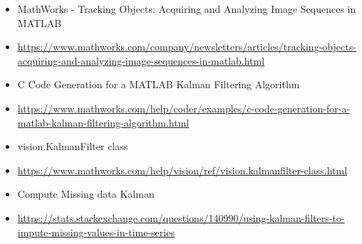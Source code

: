 \begin{itemize}
\item[] MathWorks - Tracking Objects: Acquiring and Analyzing Image Sequences in MATLAB
\item[] \url{https://www.mathworks.com/company/newsletters/articles/tracking-objects-acquiring-and-analyzing-image-sequences-in-matlab.html}
\item[] C Code Generation for a MATLAB Kalman Filtering Algorithm
\item[] \url{https://www.mathworks.com/help/coder/examples/c-code-generation-for-a-matlab-kalman-filtering-algorithm.html}
\item[] vision.KalmanFilter class
\item[] \url{https://www.mathworks.com/help/vision/ref/vision.kalmanfilter-class.html }
\item[] Compute Missing data Kalman
\item[] \url{https://stats.stackexchange.com/questions/140990/using-kalman-filters-to-impute-missing-values-in-time-series}

\end{itemize}
